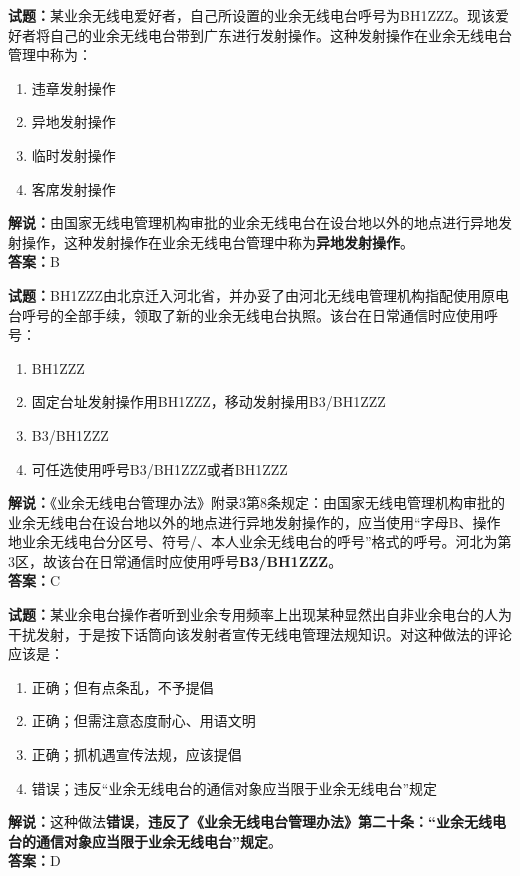 \documentclass{ctexbook}
\begin{document}
\bigskip


\noindent\textbf{试题：}某业余无线电爱好者，自己所设置的业余无线电台呼号为BH1ZZZ。现该爱好者将自己的业余无线电台带到广东进行发射操作。这种发射操作在业余无线电台管理中称为：
\begin{enumerate}[leftmargin=3em]
	\item 违章发射操作
	\item 异地发射操作
	\item 临时发射操作
	\item 客席发射操作
\end{enumerate}
\noindent\textbf{解说：}由国家无线电管理机构审批的业余无线电台在设台地以外的地点进行异地发射操作，这种发射操作在业余无线电台管理中称为\textbf{异地发射操作}。\\\noindent\textbf{答案：}B





\bigskip


\noindent\textbf{试题：}BH1ZZZ由北京迁入河北省，并办妥了由河北无线电管理机构指配使用原电台呼号的全部手续，领取了新的业余无线电台执照。该台在日常通信时应使用呼号：
\begin{enumerate}[leftmargin=3em]
	\item BH1ZZZ
	\item 固定台址发射操作用BH1ZZZ，移动发射操用B3/BH1ZZZ
	\item B3/BH1ZZZ
	\item 可任选使用呼号B3/BH1ZZZ或者BH1ZZZ
\end{enumerate}
\noindent\textbf{解说：}《业余无线电台管理办法》附录3第8条规定：由国家无线电管理机构审批的业余无线电台在设台地以外的地点进行异地发射操作的，应当使用“字母B、操作地业余无线电台分区号、符号/、本人业余无线电台的呼号”格式的呼号。河北为第3区，故该台在日常通信时应使用呼号\textbf{B3/BH1ZZZ}。\\\noindent\textbf{答案：}C



\bigskip


\noindent\textbf{试题：}某业余电台操作者听到业余专用频率上出现某种显然出自非业余电台的人为干扰发射，于是按下话筒向该发射者宣传无线电管理法规知识。对这种做法的评论应该是：
\begin{enumerate}[leftmargin=3em]
	\item 正确；但有点条乱，不予提倡
	\item 正确；但需注意态度耐心、用语文明
	\item 正确；抓机遇宣传法规，应该提倡
	\item 错误；违反“业余无线电台的通信对象应当限于业余无线电台”规定
\end{enumerate}
\noindent\textbf{解说：}这种做法\textbf{错误}，\textbf{违反了《业余无线电台管理办法》第二十条：“业余无线电台的通信对象应当限于业余无线电台”规定}。\\\noindent\textbf{答案：}D
\end{document}
